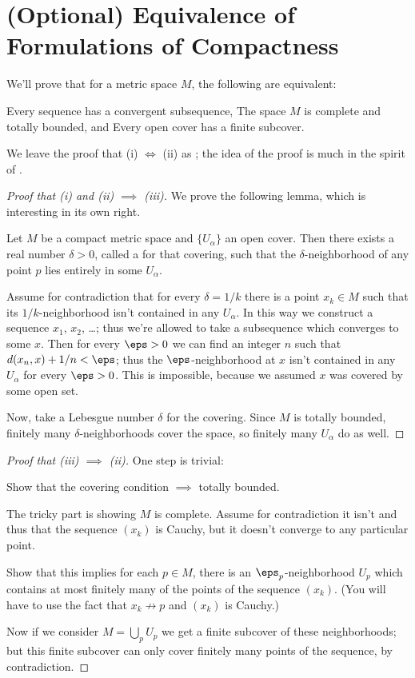 \section{(Optional) Equivalence of Formulations of Compactness}
We'll prove that for a metric space $M$, the following are equivalent:
\begin{enumerate}[(i)]
	\ii Every sequence has a convergent subsequence,
	\ii The space $M$ is complete and totally bounded, and
	\ii Every open cover has a finite subcover.
\end{enumerate}
We leave the proof that (i) $\iff$ (ii) as ;
the idea of the proof is much in the spirit of .
\begin{proof}
	[Proof that (i) and (ii) $\implies$ (iii)]
	We prove the following lemma, which is interesting in its own right.
	\begin{lemma}
		Let $M$ be a compact metric space and $\{U_\alpha\}$ an open cover.
		Then there exists a real number $\delta > 0$, called a  for that covering,
		such that the $\delta$-neighborhood of any point $p$ lies entirely in some $U_\alpha$.
	\end{lemma}
	\begin{subproof}
		Assume for contradiction that for every $\delta = 1/k$ there is a point $x_k \in M$
		such that its $1/k$-neighborhood isn't contained in any $U_\alpha$.
		In this way we construct a sequence $x_1$, $x_2$, \dots;
		thus we're allowed to take a subsequence which converges to some $x$.
		Then for every $\eps > 0$ we can find an integer $n$ such that $d(x_n, x) + 1/n < \eps$;
		thus the $\eps$-neighborhood at $x$ isn't contained in any $U_\alpha$ for every $\eps > 0$.
		This is impossible, because we assumed $x$ was covered by some open set.
	\end{subproof}
	Now, take a Lebesgue number $\delta$ for the covering.
	Since $M$ is totally bounded, finitely many $\delta$-neighborhoods cover the space,
	so finitely many $U_\alpha$ do as well.
\end{proof}

\begin{proof}
	[Proof that (iii) $\implies$ (ii)]
	One step is trivial:
	\begin{ques}
		Show that the covering condition $\implies$ totally bounded.
	\end{ques}
	The tricky part is showing $M$ is complete.
	Assume for contradiction it isn't and thus that the sequence $(x_k)$ is Cauchy,
	but it doesn't converge to any particular point.
	\begin{ques}
		Show that this implies for each $p \in M$, there is an $\eps_p$-neighborhood $U_p$
		which contains at most finitely many of the points of the sequence $(x_k)$.
		(You will have to use the fact that $x_k \not\to p$ and $(x_k)$ is Cauchy.)
	\end{ques}
	Now if we consider $M = \bigcup_p U_p$ we get a finite subcover of these neighborhoods;
	but this finite subcover can only cover finitely many points of the sequence, by contradiction.
\end{proof}


